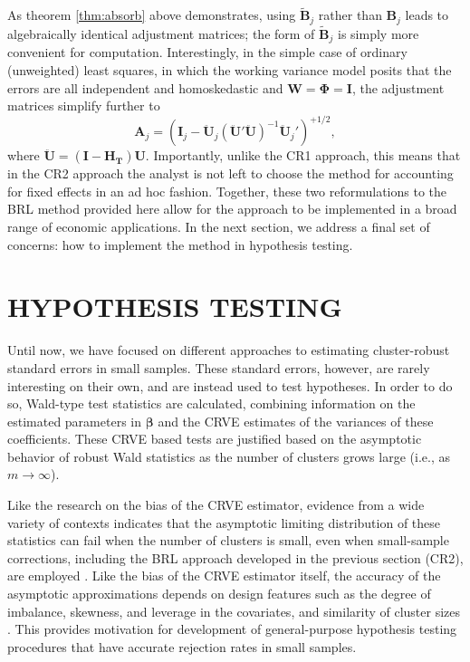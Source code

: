 \documentclass[12pt]{article}
\newcommand{\bm}{\mathbf}
\newcommand{\bs}{\boldsymbol}
\begin{document}
As theorem \ref{thm:absorb} above demonstrates, using $\bm{\tilde{B}}_j$ rather than $\bm{B}_j$ leads to algebraically identical adjustment matrices; the form of $\bm{\tilde{B}}_j$ is simply more convenient for computation.
Interestingly, in the simple case of ordinary (unweighted) least squares, in which the working variance model posits that the errors are all independent and homoskedastic and $\bm{W} = \bs\Phi = \bm{I}$, the adjustment matrices simplify further to \[
\bm{A}_j = \left(\bm{I}_j - \bm{\ddot{U}}_j\left(\bm{\ddot{U}}'\bm{\ddot{U}}\right)^{-1}\bm{\ddot{U}}_j'\right)^{+1/2},\]
where $\bm{\ddot{U}} = \left(\bm{I} - \bm{H_T}\right)\bm{U}$.
Importantly, unlike the CR1 approach, this means that in the CR2 approach the analyst is not left to choose the method for accounting for fixed effects in an ad hoc fashion.
Together, these two reformulations to the BRL method provided here allow for the approach to be implemented in a broad range of economic applications.
In the next section, we address a final set of concerns: how to implement the method in hypothesis testing. 


\section{HYPOTHESIS TESTING}
\label{sec:testing}

Until now, we have focused on different approaches to estimating cluster-robust standard errors in small samples. 
These standard errors, however, are rarely interesting on their own, and are instead used to test hypotheses.
In order to do so, Wald-type test statistics are calculated, combining information on the estimated parameters in $\bs\beta$ and the CRVE estimates of the variances of these coefficients.
These CRVE based tests are justified based on the asymptotic behavior of robust Wald statistics as the number of clusters grows large (i.e., as $m \to \infty$). 

Like the research on the bias of the CRVE estimator, evidence from a wide variety of contexts indicates that the asymptotic limiting distribution of these statistics can fail when the number of clusters is small, even when small-sample corrections, including the BRL approach developed in the previous section (CR2), are employed \citep{Bell2002bias, Bertrand2004how, Cameron2008bootstrap}. 
Like the bias of the CRVE estimator itself, the accuracy of the asymptotic approximations depends on design features such as the degree of imbalance, skewness, and leverage in the covariates, and similarity of cluster sizes \citep{McCaffrey2001generalizations, Tipton2015small, Webb2013wild}. 
This provides motivation for development of general-purpose hypothesis testing procedures that have accurate rejection rates in small samples.
\end{document}
